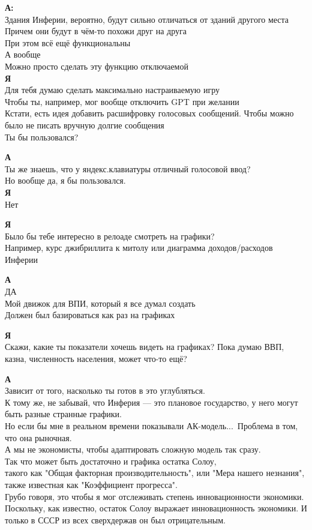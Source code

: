 \textbf{А:}\\
Здания Инферии, вероятно, будут сильно отличаться от зданий другого места\\
Причем они будут в чём-то похожи друг на друга\\
При этом всё ещё функциональны\\
А вообще\\
Можно просто сделать эту функцию отключаемой\\

\textbf{Я}\\
Для тебя думаю сделать максимально настраиваемую игру\\
Чтобы ты, например, мог вообще отключить GPT при желании\\
Кстати, есть идея добавить расшифровку голосовых сообщений. Чтобы можно было не писать вручную долгие сообщения\\
Ты бы пользовался?

\textbf{А}\\
Ты же знаешь, что у яндекс.клавиатуры отличный голосовой ввод?\\
Но вообще да, я бы пользовался.\\

\textbf{Я}\\
Нет

\textbf{Я}\\
Было бы тебе интересно в релоаде смотреть на графики?\\
Например, курс джибриллита к митолу или диаграмма доходов/расходов Инферии

\textbf{А}\\
ДА\\
Мой движок для ВПИ, который я все думал создать\\
Должен был базироваться как раз на графиках

\textbf{Я}\\
Скажи, какие ты показатели хочешь видеть на графиках? Пока думаю ВВП, казна, численность населения, может что-то ещё?

\textbf{А}\\
Зависит от того, насколько ты готов в это углубляться.\\
К тому же, не забывай, что Инферия — это плановое государство, у него могут быть разные странные графики.\\
Но если бы мне в реальном времени показывали АК-модель...\
Проблема в том, что она рыночная.\\
А мы не экономисты, чтобы адаптировать сложную модель так сразу.\\
Так что может быть достаточно и графика остатка Солоу,\\
такого как "Общая факторная производительность", или "Мера нашего незнания", также известная как "Коэффициент прогресса".\\
Грубо говоря, это чтобы я мог отслеживать степень инновационности экономики.\\
Поскольку, как известно, остаток Солоу выражает инновационность экономики. И только в СССР из всех сверхдержав он был отрицательным.\\

